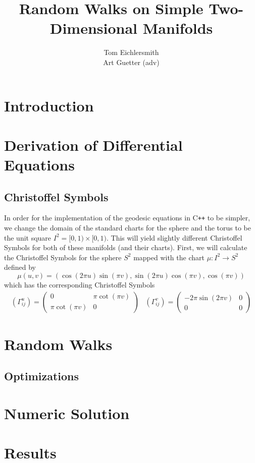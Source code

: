 \documentclass{article}
\title{Random Walks on Simple Two-Dimensional Manifolds}
\author{Tom Eichlersmith \\ Art Guetter (adv)}
\begin{document}
\section{Introduction}
	

\section{Derivation of Differential Equations}
	
	\subsection{Christoffel Symbols}
		In order for the implementation of the geodesic equations in C\texttt{++} to be simpler, we change the domain of the standard charts for the sphere and the torus to be the unit square $I^2 = [0,1) \times [0,1)$.
		This will yield slightly different Christoffel Symbols for both of these manifolds (and their charts).
		First, we will calculate the Christoffel Symbols for the sphere $S^2$ mapped with the chart $\mu:I^2 \to S^2$ defined by
		$$ \mu(u,v) = (\cos(2\pi u)\sin(\pi v), \sin(2\pi u)\cos(\pi v), \cos(\pi v)) $$
		which has the corresponding Christoffel Symbols
		\begin{equation}
			\begin{array}{lr}
			\left(\Gamma^{u}_{ij}\right) = \left( \begin{array}{cc}
			0 & \pi\cot(\pi v) \\
			\pi\cot(\pi v) & 0
			\end{array} \right) &
			\left(\Gamma^{v}_{ij}\right) = \left( \begin{array}{cc}
			-2\pi\sin(2\pi v) & 0 \\
			0 & 0
			\end{array} \right)
			\end{array}
		\end{equation}
	
\section{Random Walks}
	
	\subsection{Optimizations}

\section{Numeric Solution}

\section{Results}



\end{document}
